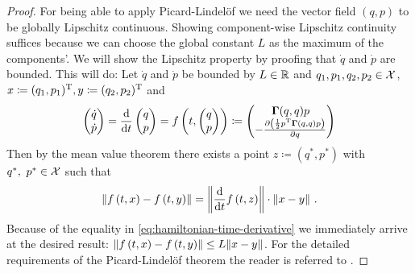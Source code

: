 \begin{proof}
	For being able to apply Picard-Lindelöf we need the vector field $(q, p)$ to be globally Lipschitz continuous.
	Showing component-wise Lipschitz continuity suffices because we can choose the global constant $L$ as the maximum of the components'.
	We will show the Lipschitz property by proofing that $\dot{q}$ and $\dot{p}$ are bounded.
	This will do:
	Let $\dot{q}$ and $\dot{p}$ be bounded by $L \in \mathbb{R}$ and $q_1, p_1, q_2, p_2 \in \mathcal{X}$, $x \coloneqq (q_1, p_1)^{\mathrm{T}}, y \coloneqq (q_2, p_2)^{\mathrm{T}}$ and
	\begin{equation}
	\label{eq:hamiltonian-time-derivative}
		\begin{pmatrix}
			\dot{q}\\\dot{p}
		\end{pmatrix}
		= \frac{\mathrm{d}}{\mathrm{d} t}\begin{pmatrix}q\\p\end{pmatrix}
		= f\left(t, \begin{pmatrix}q\\p\end{pmatrix}\right) 
		\coloneqq 			
		\begin{pmatrix}\mathbf{\Gamma}(q, q)p\\ 
		-\frac{\partial \left(\frac{1}{2} p^\mathrm{T} \mathbf{\Gamma}(q, q) p\right)}{\partial q}
		\end{pmatrix} 
	\end{equation}
	Then by the mean value theorem there exists a point $z \coloneqq (q^\ast, p^\ast)$ with $q^\ast,\ p^\ast \in \mathcal{X}$ such that
	\begin{align}
		\norm{f\left(t, x\right) - f\left(t, y\right) }
		= \norm{
			\frac{\mathrm{d}}{\mathrm{d} t}f\left(t, z \right)}
		\cdot \norm{x-y} \ .
	\end{align}
	Because of the equality in \cref{eq:hamiltonian-time-derivative} we immediately arrive at the desired result:
	$\norm{f\left(t, x\right) - f\left(t, y\right) } \leq L \norm{x - y}$.
	For the detailed requirements of the Picard-Lindelöf theorem the reader is referred to \cite{arino06, tenenbaum85}.
	

\end{proof}
